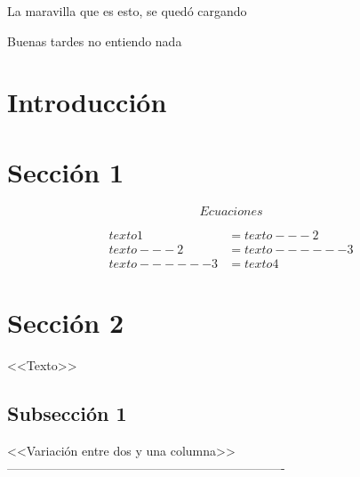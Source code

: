 \documentclass[letterpaper,11pt]{article}
\begin{document}


%

\begin{resumen}
    La maravilla que es esto, se quedó cargando
\end{resumen}

\begin{abs}
    Buenas tardes no entiendo nada
\end{abs}

\begin{multicols}{2}

\section{Introducción}

\section{Sección 1} 

\begin{equation}
    Ecuaciones
\label{ecuacion}
\end{equation}

\begin{equation*} %
\begin{split}
    texto1 & = texto---2 \\
    texto---2 & = texto------3 \\
    texto------3 & = texto4
\end{split}
\end{equation*}

\section{Sección 2}

<<Texto>>

\end{multicols}

\subsection{Subsección 1}

<<Variación entre dos y una columna>> -------------------------------------------------------------------
\end{document}
